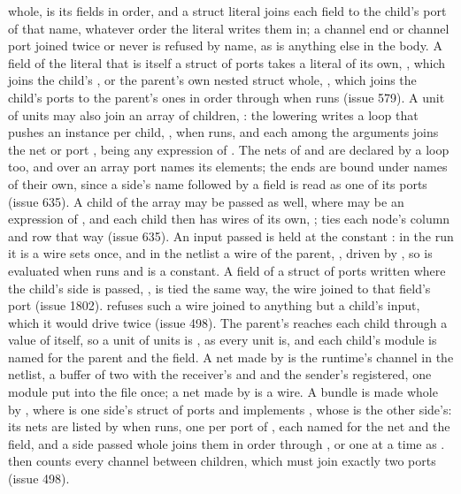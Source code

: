 whole, is its fields in order, and a struct literal
 joins each field to the child's port of that
name, whatever order the literal writes them in; a channel end or
channel port joined twice or never is refused by name, as is anything else in the body.
A field of the literal that is itself a struct of ports takes a
literal of its own, , which joins the
child's , or the parent's own nested struct whole,
, which joins the child's  ports to the
parent's  ones in order through 
when  runs (issue 579).
A unit of units may also join an array of children,
:
the lowering writes a loop that pushes an instance per child,
, when  runs, and each  among
the arguments joins the net or port ,  being any
expression of . The nets of  and  are
declared by a loop too, and  over an array port names
its elements; the ends are bound under names of their own, since a
side's name followed by a field is read as one of its ports (issue
635).
A child of the array may be passed  as well, where 
may be an expression of , and each child then has wires of
its own, ;  ties each node's column and row
that way (issue 635).
An input passed  is held at the constant : in
the run it is a wire  sets once, and in the netlist
a wire of the parent, , driven by ,
so  is evaluated when  runs and is a constant.
A field of a struct of ports written where the child's side is
passed, , is tied the same way, the wire joined to
that field's port (issue 1802).
 refuses such a wire joined to anything but a
child's input, which it would drive twice (issue 498). The
parent's  reaches each child through a value of
itself, so a unit of units is , as every unit is, and
each child's module is named for the parent and the field. A net
made by  is the runtime's channel in the netlist, a
buffer of two with the receiver's  and  and
the sender's  registered, one module 
put into the file once; a net made by  is a wire. A
bundle is made whole by , where
 is one side's struct of ports and implements ,
whose  is the other side's: its nets are listed by
 when  runs, one per port of
, each named for the net and the field, and a side passed
whole joins them in order through , or one at a time
as .  then counts every channel
between children, which must join exactly two ports (issue 498).

